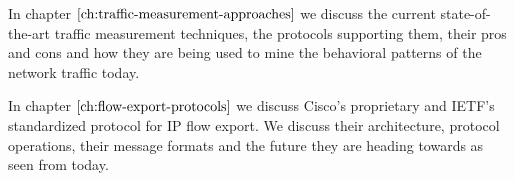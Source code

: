 
\vspace{50pt}

In chapter $\ref{ch:traffic-measurement-approaches}$ we discuss the current state-of-the-art traffic measurement techniques, the protocols supporting them, their pros and cons and how they are being used to mine the behavioral patterns of the network traffic today. 

In chapter $\ref{ch:flow-export-protocols}$ we discuss Cisco's proprietary and \ac{IETF}'s standardized protocol for \ac{IP} flow export. We discuss their architecture, protocol operations, their message formats and the future they are heading towards as seen from today.


